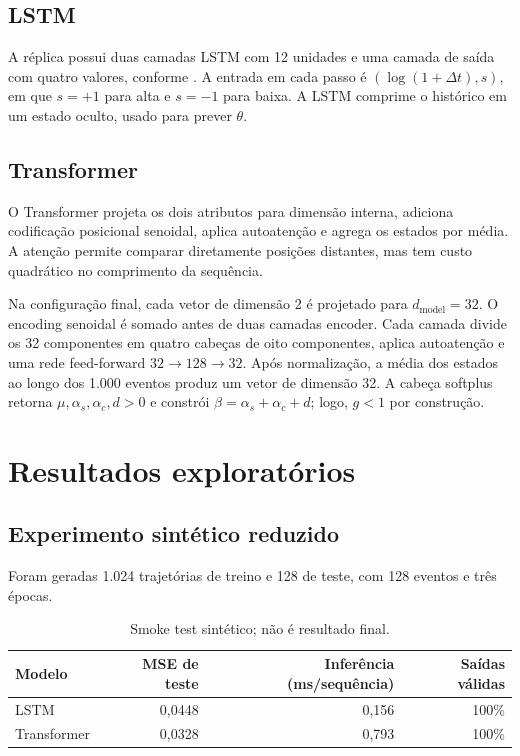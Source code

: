 \documentclass[12pt,a4paper]{report}
\begin{document}
\section{LSTM}

A réplica possui duas camadas LSTM com 12 unidades e uma camada de saída com quatro
valores, conforme \citet{lee2023}. A entrada em cada passo é
\((\log(1+\Delta t),s)\), em que \(s=+1\) para alta e \(s=-1\) para baixa. A LSTM
\citep{hochreiter1997} comprime o histórico em um estado oculto, usado para prever
\(\theta\).

\section{Transformer}

O Transformer \citep{vaswani2017} projeta os dois atributos para dimensão interna,
adiciona codificação posicional senoidal, aplica autoatenção e agrega os estados por
média. A atenção permite comparar diretamente posições distantes, mas tem custo
quadrático no comprimento da sequência.

Na configuração final, cada vetor de dimensão 2 é projetado para \(d_{\mathrm{model}}=32\).
O encoding senoidal é somado antes de duas camadas encoder. Cada camada divide os
32 componentes em quatro cabeças de oito componentes, aplica autoatenção e uma rede
feed-forward \(32\rightarrow128\rightarrow32\). Após normalização, a média dos
estados ao longo dos 1.000 eventos produz um vetor de dimensão 32. A cabeça
softplus retorna \(\mu,\alpha_s,\alpha_c,d>0\) e constrói
\(\beta=\alpha_s+\alpha_c+d\); logo, \(g<1\) por construção.

\chapter{Resultados exploratórios}

\section{Experimento sintético reduzido}

Foram geradas 1.024 trajetórias de treino e 128 de teste, com 128 eventos e três épocas.

\begin{table}[ht]
\centering
\caption{Smoke test sintético; não é resultado final.}
\begin{tabular}{lrrr}
\toprule
Modelo & MSE de teste & Inferência (ms/sequência) & Saídas válidas\\
\midrule
LSTM & 0,0448 & 0,156 & 100\%\\
Transformer & 0,0328 & 0,793 & 100\%\\
\bottomrule
\end{tabular}
\end{table}
\end{document}
